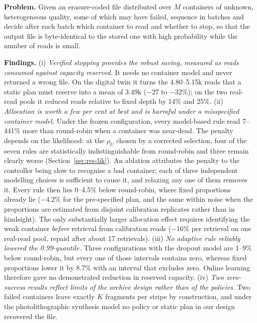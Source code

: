 \documentclass[conference,onecolumn,11pt]{IEEEtran}
\begin{document}
\textbf{Problem.}  Given an erasure-coded file distributed over $M$ containers of unknown,
heterogeneous quality, some of which may have failed, sequence in batches and decide after
each batch which container to read and whether to stop, so that the output file is
byte-identical to the stored one with high probability while the number of reads is small.

\textbf{Findings.}  (i) \emph{Verified stopping provides the robust saving, measured as reads consumed
against capacity reserved.}  It needs no container model and never returned a wrong file.  On the
digital twin it turns the 4.80--5.15k reads that a static plan must reserve into a mean of 3.49k
($-$27 to $-$32\%); on the two real-read pools it reduced reads relative to fixed depth by 14\% and 25\%.
(ii) \emph{Allocation is worth a few per cent at best and is harmful under a misspecified container
model.}  Under the frozen configuration, every model-based rule read 7--441\% more than round-robin when
a container was near-dead.  The penalty depends on the likelihood: at the $\rho_U$ chosen by a corrected
selection, four of the seven rules are statistically indistinguishable from round-robin and three remain
clearly worse (Section~\ref{sec:res-lik}).  An ablation attributes the penalty to the controller being
slow to recognise a bad container; each of three independent modelling choices is sufficient to cause
it, and relaxing any one of them removes it.  Every rule then lies 0--4.5\% below round-robin, where
fixed proportions already lie ($-$4.2\% for the pre-specified plan, and the same within noise when the
proportions are estimated from disjoint calibration replicates rather than in hindsight).  The only
substantially larger allocation effect requires identifying the weak container \emph{before} retrieval
from calibration reads ($-$16\% per retrieval on one real-read pool, repaid after about 17 retrievals).
(iii) \emph{No adaptive rule reliably lowered the 0.99-quantile.}  Three configurations with the dropout
model are 1--9\% below round-robin, but every one of those intervals contains zero, whereas fixed
proportions lower it by 8.7\% with an interval that excludes zero.  Online learning therefore gave no
demonstrated reduction in reserved capacity.
(iv) \emph{Two zero-success results reflect limits of the archive design rather than of the policies.}
Two failed containers leave exactly $K$ fragments per stripe by construction, and under the
photolithographic synthesis model no policy or static plan in our design recovered the file.
\end{document}
